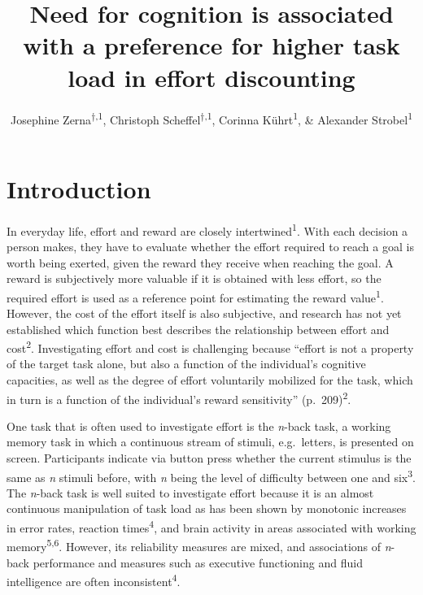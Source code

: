 \documentclass[
  man,floatsintext]{apa6}
\title{Need for cognition is associated with a preference for higher task load in effort discounting}
\author{Josephine Zerna\textsuperscript{$\dagger{}$,1}, Christoph Scheffel\textsuperscript{$\dagger{}$,1}, Corinna Kührt\textsuperscript{1}, \& Alexander Strobel\textsuperscript{1}}
\date{}
\affiliation{\vspace{0.5cm}\textsuperscript{1} Faculty of Psychology, Dresden University of Technology, 01062 Dresden, Germany}
\begin{document}
\maketitle

\renewcommand\thesection{\Alph{section}}
\setcounter{figure}{0}

\hypertarget{introduction}{%
\section{Introduction}\label{introduction}}

In everyday life, effort and reward are closely intertwined\textsuperscript{1}.
With each decision a person makes, they have to evaluate whether the effort required to reach a goal is worth being exerted, given the reward they receive when reaching the goal.
A reward is subjectively more valuable if it is obtained with less effort, so the required effort is used as a reference point for estimating the reward value\textsuperscript{1}.
However, the cost of the effort itself is also subjective, and research has not yet established which function best describes the relationship between effort and cost\textsuperscript{2}.
Investigating effort and cost is challenging because ``effort is not a property of the target task alone, but also a function of the individual's cognitive capacities, as well as the degree of effort voluntarily mobilized for the task, which in turn is a function of the individual's reward sensitivity'' (p.~209)\textsuperscript{2}.

One task that is often used to investigate effort is the \emph{n}-back task, a working memory task in which a continuous stream of stimuli, e.g.~letters, is presented on screen.
Participants indicate via button press whether the current stimulus is the same as \emph{n} stimuli before, with \emph{n} being the level of difficulty between one and six\textsuperscript{3}.
The \emph{n}-back task is well suited to investigate effort because it is an almost continuous manipulation of task load as has been shown by monotonic increases in error rates, reaction times\textsuperscript{4}, and brain activity in areas associated with working memory\textsuperscript{5,6}.
However, its reliability measures are mixed, and associations of \emph{n}-back performance and measures such as executive functioning and fluid intelligence are often inconsistent\textsuperscript{4}.
\end{document}
